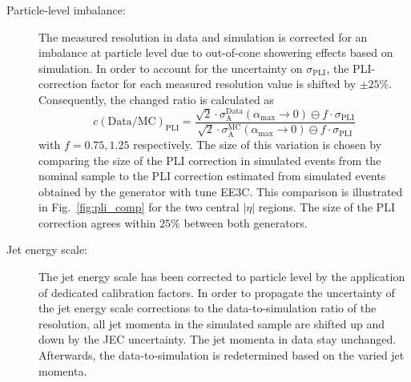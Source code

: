 \begin{description}
 \item[Particle-level imbalance:] 
The measured resolution in data and simulation is corrected for an imbalance at particle level due to out-of-cone showering effects based on simulation. In order to account for the uncertainty on $\sigma_\mathrm{PLI}$, the PLI-correction factor for each measured resolution value is shifted by $\pm 25\%$. Consequently, the changed ratio is calculated as
 \begin{equation}
  c\mathrm{(Data/MC)_{PLI}} = \frac{\sqrt{2} \cdot \sigma^\mathrm{Data}_\mathrm{A}(\alpha_\mathrm{max} \rightarrow 0) \ominus f \cdot \sigma_\mathrm{PLI}}{\sqrt{2} \cdot \sigma^\mathrm{MC}_\mathrm{A}(\alpha_\mathrm{max} \rightarrow 0) \ominus f \cdot \sigma_\mathrm{PLI}}  
 \end{equation}
with $f=0.75, 1.25$ respectively. The size of this variation is chosen by comparing the size of the PLI correction in simulated events from the nominal \pythia sample to the PLI correction estimated from simulated events obtained by the \herwig generator with tune EE3C. This comparison is illustrated in Fig.~\ref{fig:pli_comp} for the two central $|\eta|$ regions. The size of the PLI correction agrees within $25\%$ between both generators.
 
 \item[Jet energy scale:] The jet energy scale has been corrected to particle level by the application of dedicated calibration factors. In order to propagate the uncertainty of the jet energy scale corrections to the data-to-simulation ratio of the resolution, all jet momenta in the simulated sample are shifted up and down by the JEC uncertainty. The jet momenta in data stay unchanged. Afterwards, the data-to-simulation is redetermined based on the varied jet momenta.


\end{description}
